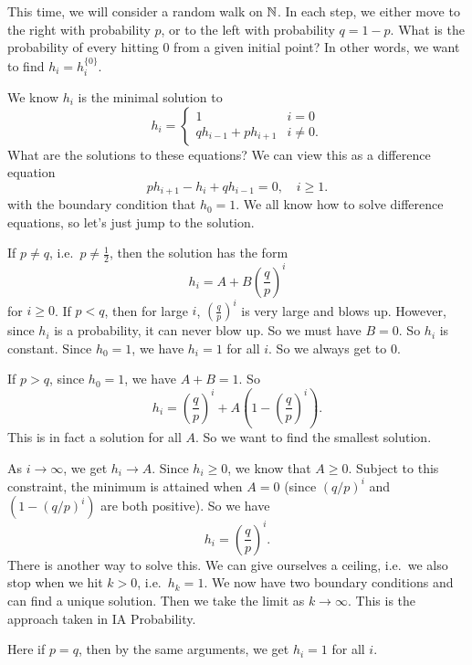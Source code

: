 \documentclass[a4paper]{article}
\begin{document}
\begin{eg}
  This time, we will consider a random walk on $\mathbb{N}$. In each step, we either move to the right with probability $p$, or to the left with probability $q = 1 - p$. What is the probability of every hitting $0$ from a given initial point? In other words, we want to find $h_i = h_i^{\{0\}}$.

  We know $h_i$ is the minimal solution to
  \[
    h_i =
    \begin{cases}
      1 & i = 0\\
      qh_{i - 1} + ph_{i + 1} & i \not= 0.
    \end{cases}
  \]
  What are the solutions to these equations? We can view this as a difference equation
  \[
    ph_{i + 1} - h_i + qh_{i - 1} = 0,\quad i \geq 1.
  \]
  with the boundary condition that $h_0 = 1$. We all know how to solve difference equations, so let's just jump to the solution.

  If $p \not= q$, i.e.\ $p \not= \frac{1}{2}$, then the solution has the form
  \[
    h_i = A + B\left(\frac{q}{p}\right)^i
  \]
  for $i \geq 0$. If $p < q$, then for large $i$, $\left(\frac{q}{p}\right)^i$ is very large and blows up. However, since $h_i$ is a probability, it can never blow up. So we must have $B = 0$. So $h_i$ is constant. Since $h_0 = 1$, we have $h_i = 1$ for all $i$. So we always get to $0$.

  If $p > q$, since $h_0 = 1$, we have $A + B = 1$. So
  \[
    h_i = \left(\frac{q}{p}\right)^i + A\left(1 - \left(\frac{q}{p}\right)^i\right).
  \]
  This is in fact a solution for all $A$. So we want to find the smallest solution.

  As $i \to\infty$, we get $h_i \to A$. Since $h_i \geq 0$, we know that $A \geq 0$. Subject to this constraint, the minimum is attained when $A = 0$ (since $(q/p)^i$ and $(1 - (q/p)^i)$ are both positive). So we have
  \[
    h_i = \left(\frac{q}{p}\right)^i.
  \]
  There is another way to solve this. We can give ourselves a ceiling, i.e.\ we also stop when we hit $k > 0$, i.e.\ $h_k = 1$. We now have two boundary conditions and can find a unique solution. Then we take the limit as $k \to \infty$. This is the approach taken in IA Probability.

  Here if $p = q$, then by the same arguments, we get $h_i = 1$ for all $i$.
\end{eg}
\end{document}
